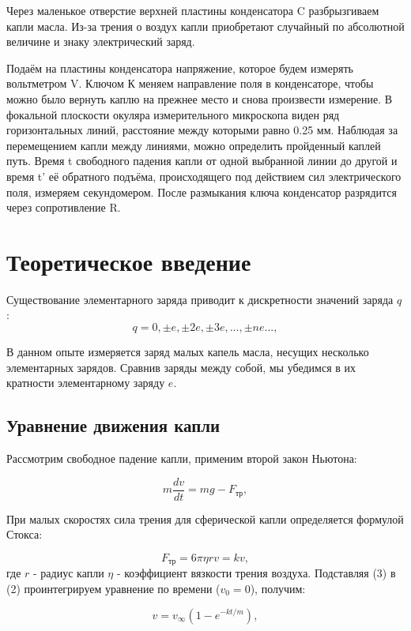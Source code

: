 \documentclass{lab}
\begin{document}
Через маленькое отверстие верхней пластины конденсатора C разбрызгиваем капли масла. Из-за трения о воздух капли приобретают случайный по абсолютной величине и знаку электрический заряд.

Подаём на пластины конденсатора напряжение, которое будем измерять вольтметром V. Ключом К меняем направление поля в конденсаторе, чтобы можно было вернуть каплю на прежнее место и снова произвести измерение. В фокальной плоскости окуляра измерительного микроскопа виден ряд горизонтальных линий, расстояние между которыми равно 0.25 мм. Наблюдая за перемещением капли между линиями, можно определить пройденный каплей путь. Время t свободного падения капли от одной выбранной линии до другой и время t' её обратного подъёма, происходящего под действием сил электрического поля, измеряем секундомером. После размыкания ключа конденсатор разрядится через сопротивление R.
\newpage
\section{Теоретическое введение}
Существование элементарного заряда приводит к дискретности значений заряда $q$:
\begin{equation}
    q = 0, \pm e, \pm 2e, \pm 3e, ..., \pm ne ...,
\end{equation}

В данном опыте измеряется заряд малых капель масла, несущих несколько элементарных зарядов. Сравнив заряды между собой, мы убедимся в их кратности элементарному заряду $e$.

\subsection*{Уравнение движения капли}
Рассмотрим свободное падение капли, применим второй закон Ньютона:

\begin{equation}
    m \frac{dv}{dt} = mg - F_{\text{тр}},
\end{equation}

При малых скоростях сила трения для сферической капли определяется формулой Стокса:

\begin{equation}
    F_{\text{тр}} = 6\pi\eta r v = kv,
    \label{eq:friction}
\end{equation}
где $r$ - радиус капли $\eta$ - коэффициент вязкости трения воздуха.
Подставляя (3) в (2) проинтегрируем уравнение по времени ($v_{0} = 0$), получим:

\begin{equation}
    v = v_{\infty}(1 - e^{-kt/m}),
    \label{eq:speed_inf}
\end{equation}
\end{document}
